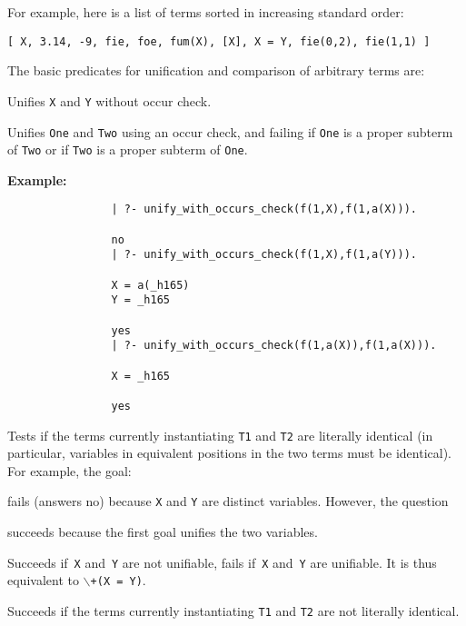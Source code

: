 For example, here is a list of terms sorted in increasing standard order:
\begin{center}
	{\tt [ X, 3.14, -9, fie, foe, fum(X), [X], X = Y, fie(0,2), fie(1,1) ]}
\end{center}
The basic predicates for unification and comparison of arbitrary terms are:
\begin{description}

    Unifies {\tt X} and {\tt Y} without occur check.

%
Unifies {\tt One} and {\tt Two} using an occur check, and failing if
{\tt One} is a proper subterm of {\tt Two} or if {\tt Two} is a proper
subterm of {\tt One}.  

{\bf Example:}
    {\footnotesize
     \begin{verbatim}
                | ?- unify_with_occurs_check(f(1,X),f(1,a(X))).

                no
                | ?- unify_with_occurs_check(f(1,X),f(1,a(Y))).

                X = a(_h165)
                Y = _h165

                yes
                | ?- unify_with_occurs_check(f(1,a(X)),f(1,a(X))).

                X = _h165

                yes
  \end{verbatim}}

%
    Tests if the terms currently instantiating {\tt T1} and {\tt T2}
    are literally identical (in particular, variables in equivalent positions
    in the two terms must be identical).
    For example, the goal:


    \noindent
    fails (answers no) because {\tt X} and {\tt Y} are distinct variables.
    However, the question


    \noindent
    succeeds because the first goal unifies the two variables.

    Succeeds if~{\tt X} and~{\tt Y} are not unifiable,
    fails if~{\tt X} and~{\tt Y} are unifiable.
    It is thus equivalent to {\tt $\backslash$+}\/{\tt (X = Y)}.

  
    Succeeds if the terms currently instantiating {\tt T1} and {\tt T2}
    are not literally identical.


\end{description}
